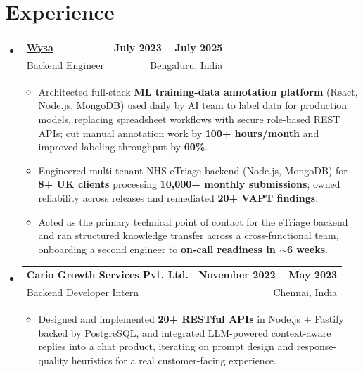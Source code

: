 \documentclass[letterpaper,10pt]{article}
\makeatletter
\newcommand{\resumeItem}[1]{
  \item\small{#1\vspace{-1pt}}
}
\newcommand{\resumeSubheading}[4]{
  \vspace{1pt}\item
    \begin{tabular*}{0.985\textwidth}[t]{l@{\extracolsep{\fill}}r}
      \textbf{#1} & \textbf{\small #2} \\
      {\small\color{ResumeSlate} #3} & {\small\color{ResumeSlate} #4} \\
    \end{tabular*}\vspace{-6pt}
}
\newcommand{\resumeSubHeadingListStart}{\begin{itemize}[leftmargin=0.0in, label={}, itemsep=2pt, topsep=2pt]}
\newcommand{\resumeSubHeadingListEnd}{\end{itemize}}
\newcommand{\resumeItemListStart}{\begin{itemize}[leftmargin=0.18in, itemsep=2pt, topsep=1pt]}
\newcommand{\resumeItemListEnd}{\end{itemize}\vspace{-4pt}}
\makeatother
\begin{document}
\section{Experience}
\resumeSubHeadingListStart
  \resumeSubheading
    {\href{https://www.wysa.io}{Wysa}}{July 2023 -- July 2025}
    {Backend Engineer}{Bengaluru, India}
    \resumeItemListStart
      \resumeItem{Architected full-stack \textbf{ML training-data annotation platform} (React, Node.js, MongoDB) used daily by AI team to label data for production models, replacing spreadsheet workflows with secure role-based REST APIs; cut manual annotation work by \textbf{100+ hours/month} and improved labeling throughput by \textbf{60\%}.}
      \resumeItem{Engineered multi-tenant NHS eTriage backend (Node.js, MongoDB) for \textbf{8+ UK clients} processing \textbf{10{,}000+ monthly submissions}; owned reliability across releases and remediated \textbf{20+ VAPT findings}.}
      \resumeItem{Acted as the primary technical point of contact for the eTriage backend and ran structured knowledge transfer across a cross-functional team, onboarding a second engineer to \textbf{on-call readiness in $\sim$6 weeks}.}
    \resumeItemListEnd
  \resumeSubheading
    {Cario Growth Services Pvt. Ltd.}{November 2022 -- May 2023}
    {Backend Developer Intern}{Chennai, India}
    \resumeItemListStart
      \resumeItem{Designed and implemented \textbf{20+ RESTful APIs} in Node.js + Fastify backed by PostgreSQL, and integrated LLM-powered context-aware replies into a chat product, iterating on prompt design and response-quality heuristics for a real customer-facing experience.}
    \resumeItemListEnd
\resumeSubHeadingListEnd
\vspace{-4pt}
\end{document}
